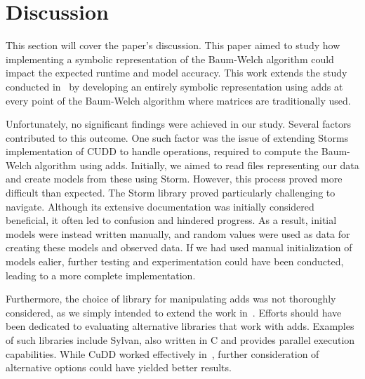 

\section{Discussion}\label{sec:discussion}

This section will cover the paper's discussion. This paper aimed to study how implementing a symbolic representation of the Baum-Welch algorithm could impact the expected runtime and model accuracy. This work extends the study conducted in~\cite{p7} by developing an entirely symbolic representation using \glspl{add} at every point of the Baum-Welch algorithm where matrices are traditionally used.

Unfortunately, no significant findings were achieved in our study. Several factors contributed to this outcome. One such factor was the issue of extending Storms implementation of CUDD to handle operations, required to compute the Baum-Welch algorithm using \glspl{add}. Initially, we aimed to read files representing our data and create models from these using Storm. However, this process proved more difficult than expected. The Storm library proved particularly challenging to navigate. Although its extensive documentation was initially considered beneficial, it often led to confusion and hindered progress. As a result, initial models were instead written manually, and random values were used as data for creating these models and observed data. If we had used manual initialization of models ealier, further testing and experimentation could have been conducted, leading to a more complete implementation.


Furthermore, the choice of library for manipulating \glspl{add} was not thoroughly considered, as we simply intended to extend the work in~\cite{p7}. Efforts should have been dedicated to evaluating alternative libraries that work with \glspl{add}. Examples of such libraries include Sylvan, also written in C and provides parallel execution capabilities. While CuDD worked effectively in~\cite{p7}, further consideration of alternative options could have yielded better results.

